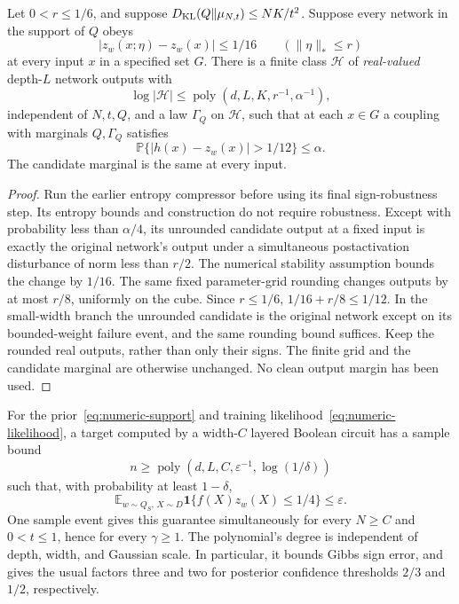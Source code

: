 \begin{lemma}
\label{lem:numeric-compression}
Let $0<r\le1/6$, and suppose
$D_{\rm KL}(Q\Vert\mu_{N,t})\le NK/t^2$. Suppose every network in the
support of $Q$ obeys
\[
 |z_w(x;\eta)-z_w(x)|\le1/16\qquad(\|\eta\|_*\le r)
\]
at every input $x$ in a specified set $G$. There is a finite class
$\mathcal H$ of \emph{real-valued} depth-$L$ network outputs with
\[
 \log|\mathcal H|\le\operatorname{poly}(d,L,K,r^{-1},\alpha^{-1}),
\]
independent of $N,t,Q$, and a law $\Gamma_Q$ on $\mathcal H$, such that
at each $x\in G$ a coupling with marginals $Q,\Gamma_Q$ satisfies
\[
 \mathbb P\{|h(x)-z_w(x)|>1/12\}\le\alpha.
\]
The candidate marginal is the same at every input.
\end{lemma}
\begin{proof}
Run the earlier entropy compressor before using its final sign-robustness
step. Its entropy bounds and construction do not require robustness.
Except with probability less than $\alpha/4$, its unrounded candidate
output at a fixed input is exactly the original network's output under
a simultaneous postactivation disturbance of norm less than $r/2$.
The numerical stability assumption bounds the change by $1/16$.
The same fixed parameter-grid rounding changes outputs by at most $r/8$,
uniformly on the cube. Since $r\le1/6$,
$1/16+r/8\le1/12$. In the small-width branch the unrounded candidate is
the original network except on its bounded-weight failure event, and the
same rounding bound suffices. Keep the rounded real outputs, rather than
only their signs. The finite grid and the candidate marginal are otherwise
unchanged. No clean output margin has been used.
\end{proof}

\begin{theorem}
\label{thm:numeric-prior}
For the prior~\eqref{eq:numeric-support} and training
likelihood~\eqref{eq:numeric-likelihood}, a target computed by a width-$C$
layered Boolean circuit has a sample bound
\[
 n\ge\operatorname{poly}(d,L,C,\varepsilon^{-1},\log(1/\delta))
\]
such that, with probability at least $1-\delta$,
\begin{equation}\label{eq:numeric-risk}
 \mathbb E_{w\sim Q_S,\,X\sim D}
       \mathbf1\{f(X)z_w(X)\le1/4\}\le\varepsilon.
\end{equation}
One sample event gives this guarantee simultaneously for every $N\ge C$
and $0<t\le1$, hence for every $\gamma\ge1$. The polynomial's degree is
independent of depth, width, and Gaussian scale. In particular, it bounds
Gibbs sign error, and gives the usual factors three and two for posterior
confidence thresholds $2/3$ and $1/2$, respectively.
\end{theorem}

